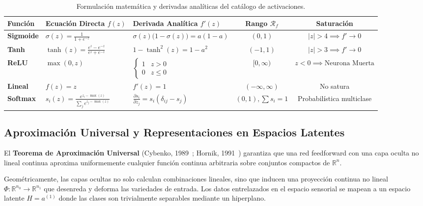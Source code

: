 \documentclass{article}
\begin{document}
\begin{table}[H]
\centering
\small
\caption{Formulación matemática y derivadas analíticas del catálogo de activaciones.}
\label{tab:activaciones}
\begin{tabularx}{\textwidth}{l p{4.3cm} p{4.3cm} c c}
\toprule
\textbf{Función} & \textbf{Ecuación Directa $f(z)$} & \textbf{Derivada Analítica $f'(z)$} & \textbf{Rango $\mathcal{R}_f$} & \textbf{Saturación} \\
\midrule
\textbf{Sigmoide} & $\sigma(z) = \frac{1}{1 + e^{-z}}$ & $\sigma(z)\big(1 - \sigma(z)\big) = a(1 - a)$ & $(0, 1)$ & $|z| > 4 \implies f' \to 0$ \\
\addlinespace
\textbf{Tanh} & $\tanh(z) = \frac{e^z - e^{-z}}{e^z + e^{-z}}$ & $1 - \tanh^2(z) = 1 - a^2$ & $(-1, 1)$ & $|z| > 3 \implies f' \to 0$ \\
\addlinespace
\textbf{ReLU} & $\max(0, z)$ & $\begin{cases} 1 & z > 0 \\ 0 & z \le 0 \end{cases}$ & $[0, \infty)$ & $z < 0 \implies \text{Neurona Muerta}$ \\
\addlinespace
\textbf{Lineal} & $f(z) = z$ & $f'(z) = 1$ & $(-\infty, \infty)$ & No satura \\
\addlinespace
\textbf{Softmax} & $s_i(z) = \frac{e^{z_i - \max(z)}}{\sum_j e^{z_j - \max(z)}}$ & $\frac{\partial s_i}{\partial z_j} = s_i(\delta_{ij} - s_j)$ & $(0, 1), \sum s_i = 1$ & Probabilística multiclase \\
\bottomrule
\end{tabularx}
\end{table}

\subsection{Aproximación Universal y Representaciones en Espacios Latentes}

El \textbf{Teorema de Aproximación Universal} (Cybenko, 1989~\cite{cybenko1989}; Hornik, 1991~\cite{hornik1991}) garantiza que una red feedforward con una capa oculta no lineal continua aproxima uniformemente cualquier función continua arbitraria sobre conjuntos compactos de $\mathbb{R}^n$.

Geométricamente, las capas ocultas no solo calculan combinaciones lineales, sino que inducen una proyección continua no lineal $\Phi: \mathbb{R}^{n_0} \to \mathbb{R}^{n_1}$ que desenreda y deforma las variedades de entrada. Los datos entrelazados en el espacio sensorial se mapean a un espacio latente $H = a^{(1)}$ donde las clases son trivialmente separables mediante un hiperplano.
\end{document}
